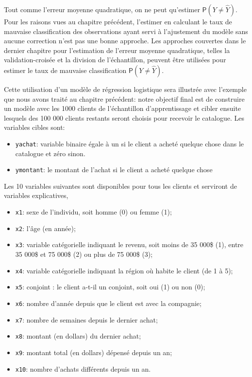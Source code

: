 \documentclass[
  11pt,
  letterpaper,
]{book}
\providecommand{\tightlist}{%
  \setlength{\itemsep}{0pt}\setlength{\parskip}{0pt}}
\theoremstyle{definition}
\theoremstyle{definition}
\theoremstyle{definition}
\theoremstyle{remark}
\begin{document}
Tout comme l'erreur moyenne quadratique, on ne peut qu'estimer \({\mathsf P}\left(Y \neq\widehat{Y}\right)\). Pour les raisons vues au chapitre précédent, l'estimer en calculant le taux de mauvaise classification des observations ayant servi à l'ajustement du modèle sans aucune correction n'est pas une bonne approche. Les approches couvertes dans le dernier chapitre pour l'estimation de l'erreur moyenne quadratique, telles la validation-croisée et la
division de l'échantillon, peuvent être utilisées pour estimer le taux de mauvaise classification \({\mathsf P}\left(Y \neq \widehat{Y}\right)\).

Cette utilisation d'un modèle de régression logistique sera illustrée avec l'exemple que nous avons traité au chapitre précédent: notre objectif final est de construire un modèle avec les 1000 clients de l'échantillon d'apprentissage et cibler ensuite lesquels des 100 000 clients restants seront choisis pour recevoir le catalogue. Les variables cibles sont:

\begin{itemize}
\tightlist
\item
  \texttt{yachat}: variable binaire égale à un si le client a acheté quelque chose dans le catalogue et zéro sinon.
\item
  \texttt{ymontant}: le montant de l'achat si le client a acheté quelque chose
\end{itemize}

Les 10 variables suivantes sont disponibles pour tous les clients et serviront de variables explicatives,

\begin{itemize}
\tightlist
\item
  \texttt{x1}: sexe de l'individu, soit homme (0) ou femme (1);
\item
  \texttt{x2}: l'âge (en année);
\item
  \texttt{x3}: variable catégorielle indiquant le revenu, soit moins de 35 000\$ (1), entre 35 000\$ et 75 000\$ (2) ou plus de 75 000\$ (3);
\item
  \texttt{x4}: variable catégorielle indiquant la région où habite le client (de 1 à 5);
\item
  \texttt{x5}: conjoint : le client a-t-il un conjoint, soit oui (1) ou non (0);
\item
  \texttt{x6}: nombre d'année depuis que le client est avec la compagnie;
\item
  \texttt{x7}: nombre de semaines depuis le dernier achat;
\item
  \texttt{x8}: montant (en dollars) du dernier achat;
\item
  \texttt{x9}: montant total (en dollars) dépensé depuis un an;
\item
  \texttt{x10}: nombre d'achats différents depuis un an.
\end{itemize}
\end{document}
